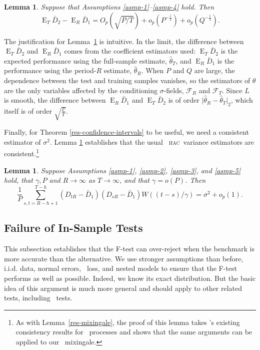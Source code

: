 \documentclass[11pt]{article}
\newtheorem{lem}[thm]{Lemma}
\DeclareMathOperator{\E}{E}
\newcommand{\citepos}[1]{\citeauthor{#1}'s \citeyearpar{#1}}
\newcommand{\oosSum}[2]{\ensuremath{\sum_{#1=R-\h+#2}^{T-\h}}}
\newcommand{\h}{h}
\newcommand{\vWeight}{W((t-s)/\gamma)}
\newcommand{\hac}{\textsc{hac}}
\begin{document}
\begin{lem} \label{res-convergence} Suppose that Assumptions
  \ref{asmp-1}--\ref{asmp-4} hold.  Then
\begin{equation*}
  \E_T \bar{D}_2 - \E_R \bar D_1 =  O_p(\sqrt{P/T}) +
  o_p(P^{-\frac12}) + o_p(Q^{-\frac12}).
\end{equation*}
\end{lem}

The justification for Lemma~\ref{res-convergence} is intuitive.  In
the limit, the difference between $\E_T \bar{D}_2$ and $\E_R \bar D_1$
comes from the coefficient estimators used: $\E_T\bar{D}_2$ is the
expected performance using the full-sample estimate, $\hat{\theta}_T$,
and $\E_R \bar D_1$ is the performance using the period-$R$ estimate,
$\hat{\theta}_R$.  When $P$ and $Q$ are large, the dependence between
the test and training samples vanishes, so the estimators of $\theta$
are the only variables affected by the conditioning $\sigma$-fields,
$\mathcal{F}_R$ and $\mathcal{F}_T$.  Since $L$ is smooth, the
difference between $\E_R \bar D_1$ and $\E_T \bar D_2$ is of order
$\lvert \hat\theta_R - \hat\theta_T \rvert_2$, which itself is of
order $\sqrt{\frac{P}{T}}$.

Finally, for Theorem \ref{res-confidence-intervals} to be useful, we
need a consistent estimator of $\sigma^2$. Lemma
\ref{res-variance-estimator} establishes that the usual \oos\ \hac\
variance estimators are consistent.\footnote{As with
      Lemma~\ref{res-mixingale}, the proof of this lemma takes
      \citepos{de_jong_consistency_2000} existing consistency results
      for \ned\ processes and shows that the same arguments can be
      applied to our \oos\ mixingale.}

\begin{lem}
  \label{res-variance-estimator}  Suppose Assumptions \ref{asmp-1},
  \ref{asmp-2}, \ref{asmp-3}, and \ref{asmp-5} hold, that $\gamma, P$
  and $R \to \infty$ as $T \to \infty$, and that $\gamma = o(P)$.  Then
  \begin{equation*}
    \frac1P \oosSum{s,t}{1} (D_{tR} - \bar D_1)(D_{sR} - \bar D_1)
    \vWeight = \sigma^2 + o_p(1).
  \end{equation*}
\end{lem}


\subsection{Failure of In-Sample Tests}\label{sec:insample}
This subsection establishes that the F-test can over-reject when the
benchmark is more accurate than the alternative.  We use stronger
assumptions than before, i.i.d. data, normal errors, \mse\ loss, and
nested models to ensure that the F-test performs as well as possible.
Indeed, we know its exact distribution.  But the basic idea of this
argument is much more general and should apply to other related tests,
including \oos\ tests.
\end{document}
